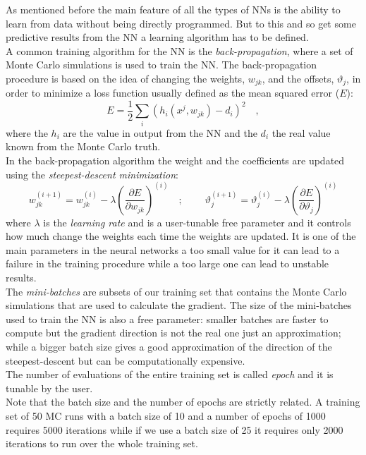 \noindent As mentioned before the main feature of all the types of NNs is the ability to learn from data without being directly programmed.
But to this and so get some predictive results from the NN a learning algorithm has to be defined.
\\
A common training algorithm for the NN is the \textit{back-propagation}, where a set of Monte Carlo simulations is used to train the NN. The back-propagation procedure is based on the idea of changing the weights, $w_{jk}$, and the offsets, $\vartheta_{j}$, in order to minimize a loss function usually defined as the mean squared error ($E$):
\begin{equation}
	E=\frac{1}{2}\displaystyle\sum_i(h_{i}(x^j,w_{jk})-d_i)^2\quad,
\end{equation}  
where the $h_{i}$ are the value in output from the NN and the $d_{i}$ the real value known from the Monte Carlo truth.
\\
In the back-propagation algorithm the weight and the coefficients are updated using the \textit{steepest-descent minimization}:
\begin{equation}
	w_{jk}^{(i+1)}=w_{jk}^{(i)}-\lambda\left( \frac{\partial E}{\partial w_{jk}} \right)^{(i)}
	\quad; \ \qquad
	\vartheta_{j}^{(i+1)}=\vartheta_{j}^{(i)}-\lambda\left( \frac{\partial E}{\partial \vartheta_{j}} \right)^{(i)}
	\label{eq:learning_bp}
\end{equation}
where $\lambda$ is the \textit{learning rate} and is a user-tunable free parameter and it controls how much change the weights each time the weights are updated.
It is one of the main parameters in the neural networks a too small value for it can lead to a failure in the training procedure while a too large one can lead to unstable results. 
\\
The \textit{mini-batches} are subsets of our training set that contains the Monte Carlo simulations that are used to calculate the gradient. The size of the mini-batches used to train the NN is also a free parameter: smaller batches are faster to compute but the gradient direction is not the real one just an approximation; while a bigger batch size gives a good approximation of the direction of the steepest-descent but can be computationally expensive. 
\\
The number of evaluations of the entire training set is called \textit{epoch} and it is tunable by the user.
\\
Note that the batch size and the number of epochs are strictly related. A training set of 50 MC runs with a batch size of 10 and a number of epochs of 1000 requires 5000 iterations while if we use a batch size of 25 it requires only 2000 iterations to run over the whole training set.
